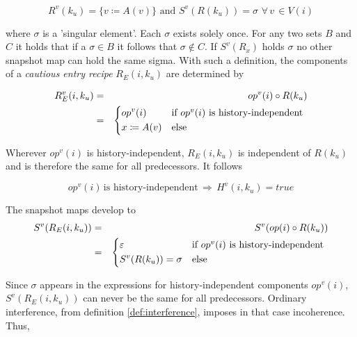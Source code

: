 \documentclass[12pt,a4paper]{scrartcl}
\begin{document}
\begin{equation} \label{eq:undetermined-recipe}
    R^v(k_u) = \{ v \coloneqq A(v) \} \,\,\mbox{and}\,\, S^v(R(k_u)) = \sigma\,\,\forall\,v\,\in V(i)
\end{equation}

where $\sigma$ is a 'singular element'. Each $\sigma$ exists solely once. For
any two sets $B$ and $C$ it holds that if a $\sigma \in B$ it follows that
$\sigma \notin C$.  If $S^v(R_x)$ holds $\sigma$ no other snapshot map can hold
the same sigma.  With such a definition, the components of a \textit{cautious
entry recipe} $R_E(i,k_u)$ are determined by

\begin{eqnarray}
    R^v_E(i,k_u) & = & op^v(i) \circ R(k_u) \\
                 & = & \begin{dcases*}
                       op^v(i)         & if $op^v(i)$ is history-independent \\
                       x \coloneq A(v) & else
                       \end{dcases*}
\end{eqnarray}

Wherever $op^v(i)$ is history-independent, $R_E(i,k_u)$ is independent of $R(k_u)$ and is
therefore the same for all predecessors. It follows

\begin{equation} \label{eq:cautious-recipe-coherence}
    op^v(i) \,\mbox{is history-independent}\,\Rightarrow\,H^v(i, k_u) = true
\end{equation}

The snapshot maps develop to
\begin{eqnarray} \label{eq:cautious-repl-1}
    S^v(R_E(i,k_u)) & = & S^v(op(i) \circ R(k_u)) \\ 
                    & = & \begin{dcases*}
                          \varepsilon          & if $op^v(i)$ is history-independent \\
                          S^v(R(k_u)) = \sigma & else
                          \end{dcases*}
\end{eqnarray}

Since $\sigma$ appears in the expressions for history-independent components
$op^v(i)$, $S^v(R_E(i,k_u))$ can never be the same for all predecessors.
Ordinary interference, from definition \ref{def:interference}, imposes in that
case incoherence. Thus,
\end{document}
